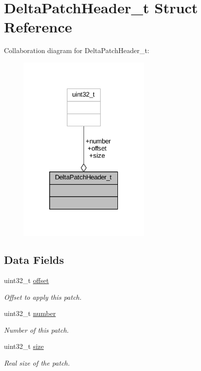 \hypertarget{struct_delta_patch_header__t}{}\section{Delta\+Patch\+Header\+\_\+t Struct Reference}
\label{struct_delta_patch_header__t}


Collaboration diagram for Delta\+Patch\+Header\+\_\+t\+:
\nopagebreak
\begin{figure}[H]
\begin{center}
\leavevmode
\includegraphics[width=184pt]{struct_delta_patch_header__t__coll__graph}
\end{center}
\end{figure}
\subsection*{Data Fields}
\begin{DoxyCompactItemize}
\item 
uint32\+\_\+t \hyperlink{struct_delta_patch_header__t_a1b849ba3b3d9f5679dd58d04d12dd0b5}{offset}
\begin{DoxyCompactList}\small\item\em Offset to apply this patch. \end{DoxyCompactList}\item 
uint32\+\_\+t \hyperlink{struct_delta_patch_header__t_a319448628ece38bf1e42ae8108a07940}{number}
\begin{DoxyCompactList}\small\item\em Number of this patch. \end{DoxyCompactList}\item 
uint32\+\_\+t \hyperlink{struct_delta_patch_header__t_a38cb9583260e028d72ee55ab92bc8860}{size}
\begin{DoxyCompactList}\small\item\em Real size of the patch. \end{DoxyCompactList}\end{DoxyCompactItemize}


